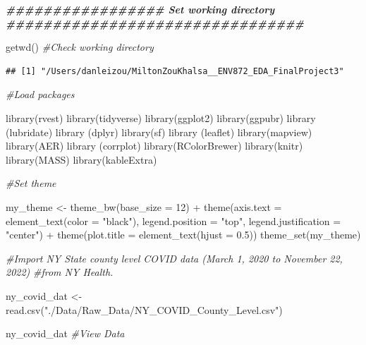 \documentclass[
  12pt,
]{article}
\newenvironment{Shaded}{\begin{snugshade}}{\end{snugshade}}
\newcommand{\AttributeTok}[1]{\textcolor[rgb]{0.77,0.63,0.00}{#1}}
\newcommand{\CommentTok}[1]{\textcolor[rgb]{0.56,0.35,0.01}{\textit{#1}}}
\newcommand{\DecValTok}[1]{\textcolor[rgb]{0.00,0.00,0.81}{#1}}
\newcommand{\DocumentationTok}[1]{\textcolor[rgb]{0.56,0.35,0.01}{\textbf{\textit{#1}}}}
\newcommand{\FloatTok}[1]{\textcolor[rgb]{0.00,0.00,0.81}{#1}}
\newcommand{\FunctionTok}[1]{\textcolor[rgb]{0.00,0.00,0.00}{#1}}
\newcommand{\NormalTok}[1]{#1}
\newcommand{\OtherTok}[1]{\textcolor[rgb]{0.56,0.35,0.01}{#1}}
\newcommand{\SpecialCharTok}[1]{\textcolor[rgb]{0.00,0.00,0.00}{#1}}
\newcommand{\StringTok}[1]{\textcolor[rgb]{0.31,0.60,0.02}{#1}}
\begin{document}
\begin{Shaded}
\begin{Highlighting}[]
\DocumentationTok{\#\#\#\#\#\#\#\#\#\#\#\#\#\#\#\#\# Set working directory \#\#\#\#\#\#\#\#\#\#\#\#\#\#\#\#\#\#\#\#\#\#\#\#\#\#\#\#\#\#\#\#}

\FunctionTok{getwd}\NormalTok{() }\CommentTok{\#Check working directory}
\end{Highlighting}
\end{Shaded}

\begin{verbatim}
## [1] "/Users/danleizou/MiltonZouKhalsa__ENV872_EDA_FinalProject3"
\end{verbatim}

\begin{Shaded}
\begin{Highlighting}[]
\CommentTok{\#Load packages}

\FunctionTok{library}\NormalTok{(rvest)}
\FunctionTok{library}\NormalTok{(tidyverse)}
\FunctionTok{library}\NormalTok{(ggplot2)}
\FunctionTok{library}\NormalTok{(ggpubr)}
\FunctionTok{library}\NormalTok{ (lubridate)}
\FunctionTok{library}\NormalTok{ (dplyr)}
\FunctionTok{library}\NormalTok{(sf)}
\FunctionTok{library}\NormalTok{ (leaflet)}
\FunctionTok{library}\NormalTok{(mapview)}
\FunctionTok{library}\NormalTok{(AER)}
\FunctionTok{library}\NormalTok{ (corrplot)}
\FunctionTok{library}\NormalTok{(RColorBrewer)}
\FunctionTok{library}\NormalTok{(knitr)}
\FunctionTok{library}\NormalTok{(MASS)}
\FunctionTok{library}\NormalTok{(kableExtra)}

\CommentTok{\#Set theme}

\NormalTok{my\_theme }\OtherTok{\textless{}{-}} \FunctionTok{theme\_bw}\NormalTok{(}\AttributeTok{base\_size =} \DecValTok{12}\NormalTok{) }\SpecialCharTok{+} 
  \FunctionTok{theme}\NormalTok{(}\AttributeTok{axis.text =} \FunctionTok{element\_text}\NormalTok{(}\AttributeTok{color =} \StringTok{"black"}\NormalTok{), }
      \AttributeTok{legend.position =} \StringTok{"top"}\NormalTok{, }\AttributeTok{legend.justification =} \StringTok{"center"}\NormalTok{) }\SpecialCharTok{+}
  \FunctionTok{theme}\NormalTok{(}\AttributeTok{plot.title =} \FunctionTok{element\_text}\NormalTok{(}\AttributeTok{hjust =} \FloatTok{0.5}\NormalTok{))}
\FunctionTok{theme\_set}\NormalTok{(my\_theme)}


\CommentTok{\#Import NY State county level COVID data (March 1, 2020 to November 22, 2022)}
\CommentTok{\#from NY Health.}

\NormalTok{ny\_covid\_dat }\OtherTok{\textless{}{-}} \FunctionTok{read.csv}\NormalTok{(}\StringTok{"./Data/Raw\_Data/NY\_COVID\_County\_Level.csv"}\NormalTok{)}

\NormalTok{ny\_covid\_dat }\CommentTok{\#View Data}
\end{Highlighting}
\end{Shaded}
\end{document}
